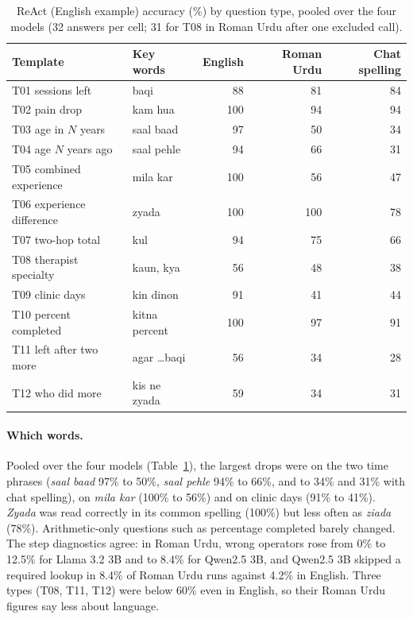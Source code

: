 \documentclass[11pt]{article}
\begin{document}
\begin{table}[t]
\centering
\small
\begin{tabular}{llrrr}
\toprule
Template & Key words & English & Roman Urdu & Chat spelling \\
\midrule
T01 sessions left & baqi & 88 & 81 & 84 \\
T02 pain drop & kam hua & 100 & 94 & 94 \\
T03 age in $N$ years & saal baad & 97 & 50 & 34 \\
T04 age $N$ years ago & saal pehle & 94 & 66 & 31 \\
T05 combined experience & mila kar & 100 & 56 & 47 \\
T06 experience difference & zyada & 100 & 100 & 78 \\
T07 two-hop total & kul & 94 & 75 & 66 \\
T08 therapist specialty & kaun, kya & 56 & 48 & 38 \\
T09 clinic days & kin dinon & 91 & 41 & 44 \\
T10 percent completed & kitna percent & 100 & 97 & 91 \\
T11 left after two more & agar \dots baqi & 56 & 34 & 28 \\
T12 who did more & kis ne zyada & 59 & 34 & 31 \\
\bottomrule
\end{tabular}
\caption{ReAct (English example) accuracy (\%) by question type, pooled over the four models (32 answers per cell; 31 for T08 in Roman Urdu after one excluded call).}
\label{tab:templates}
\end{table}

\paragraph{Which words.} Pooled over the four models (Table~\ref{tab:templates}), the largest drops were on the two time phrases (\emph{saal baad} 97\% to 50\%, \emph{saal pehle} 94\% to 66\%, and to 34\% and 31\% with chat spelling), on \emph{mila kar} (100\% to 56\%) and on clinic days (91\% to 41\%). \emph{Zyada} was read correctly in its common spelling (100\%) but less often as \emph{ziada} (78\%). Arithmetic-only questions such as percentage completed barely changed. The step diagnostics agree: in Roman Urdu, wrong operators rose from 0\% to 12.5\% for Llama 3.2 3B and to 8.4\% for Qwen2.5 3B, and Qwen2.5 3B skipped a required lookup in 8.4\% of Roman Urdu runs against 4.2\% in English. Three types (T08, T11, T12) were below 60\% even in English, so their Roman Urdu figures say less about language.
\end{document}
